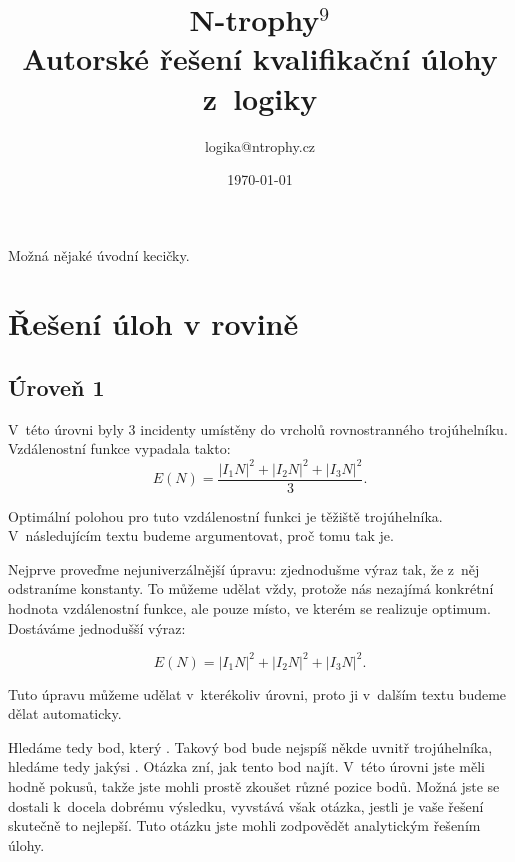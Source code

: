 \documentclass[12pt,a4paper]{article}
\begin{document}
\pagestyle{fancy}     %
\setcounter{page}{1}  %


\title{N-trophy$^9$\\Autorské řešení kvalifikační úlohy z~logiky}
\date{\today}
\author{logika@ntrophy.cz}
\maketitle

\setlength{\parindent}{0cm}
\setlength{\parskip}{3mm plus2pt minus2pt}

Možná nějaké úvodní kecičky.

\section*{Řešení úloh v rovině}
\subsection*{Úroveň 1}

V~této úrovni byly 3 incidenty umístěny do vrcholů rovnostranného trojúhelníku.
Vzdálenostní funkce vypadala takto:
$$E(N) = \frac{|I_1N|^2 + |I_2N|^2 + |I_3N|^2}{3}.$$

Optimální polohou pro tuto vzdálenostní funkci je těžiště trojúhelníka.
V~následujícím textu budeme argumentovat, proč tomu tak je.

Nejprve proveďme nejuniverzálnější úpravu: zjednodušme výraz tak, že z~něj
odstraníme konstanty. To můžeme udělat vždy, protože nás nezajímá konkrétní
hodnota vzdálenostní funkce, ale pouze místo, ve kterém se realizuje optimum.
Dostáváme jednodušší výraz:

$$E(N) = |I_1N|^2 + |I_2N|^2 + |I_3N|^2.$$

Tuto úpravu můžeme udělat v~kterékoliv úrovni, proto ji v~dalším textu budeme
dělat automaticky.

Hledáme tedy bod, který . Takový bod bude
nejspíš někde uvnitř trojúhelníka, hledáme tedy jakýsi . Otázka zní,
jak tento bod najít. V~této úrovni jste měli hodně pokusů, takže jste mohli
prostě zkoušet různé pozice bodů. Možná jste se dostali k~docela dobrému
výsledku, vyvstává však otázka, jestli je vaše řešení skutečně to nejlepší.
Tuto otázku jste mohli zodpovědět analytickým řešením úlohy.
\end{document}
